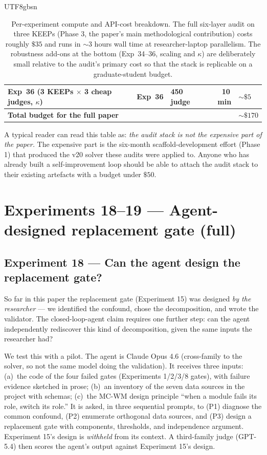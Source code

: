 \documentclass{article}
\begin{document}
\begin{CJK*}{UTF8}{gbsn}
\begin{table}[h]
\begin{tabular}{l l l r l}
\quad Exp~36 (3 KEEPs $\times$ 3 cheap judges, $\kappa$)
  & Exp~36 & 450 judge & 10\,min & \(\sim\$5\) \\
\midrule
\multicolumn{4}{l}{\textbf{Total budget for the full paper}} & \(\sim\$170\) \\
\bottomrule
\end{tabular}
\caption{Per-experiment compute and API-cost breakdown. The full
six-layer audit on three KEEPs (Phase 3, the paper's main
methodological contribution) costs roughly \(\$35\) and runs in
\({\sim}3\) hours wall time at researcher-laptop parallelism. The
robustness add-ons at the bottom (Exp~34--36, scaling and
\(\kappa\)) are deliberately small relative to the audit's primary
cost so that the stack is replicable on a graduate-student
budget.}
\label{tab:compute}
\end{table}

A typical reader can read this table as: \emph{the audit stack is
not the expensive part of the paper.} The expensive part is the
six-month scaffold-development effort (Phase 1) that produced the
v20 solver these audits were applied to. Anyone who has already
built a self-improvement loop should be able to attach the audit
stack to their existing artefacts with a budget under \(\$50\).


\section{Experiments 18--19 — Agent-designed replacement gate (full)}
\label{app:agent-gate}

\subsection{Experiment 18 — Can the agent design the
replacement gate?}
\label{sec:meta}

So far in this paper the replacement gate (Experiment 15) was
designed \emph{by the researcher} — we identified the confound,
chose the decomposition, and wrote the validator. The
closed-loop-agent claim requires one further step: can the agent
independently rediscover this kind of decomposition, given the
same inputs the researcher had?

We test this with a pilot. The agent is Claude Opus 4.6
(cross-family to the solver, so not the same model doing the
validation). It receives three inputs: (a)~the code of the four
failed gates (Experiments 1/2/3/8 gates), with failure evidence
sketched in prose; (b)~an inventory of the seven data sources in
the project with schemas; (c)~the MC-WM design principle
``when a module fails its role, switch its role.'' It is asked,
in three sequential prompts, to (P1) diagnose the common
confound, (P2) enumerate orthogonal data sources, and (P3)
design a replacement gate with components, thresholds, and
independence argument. Experiment 15's design is \emph{withheld}
from its context. A third-family judge (GPT-5.4) then scores
the agent's output against Experiment 15's design.


\end{CJK*}
\end{document}
